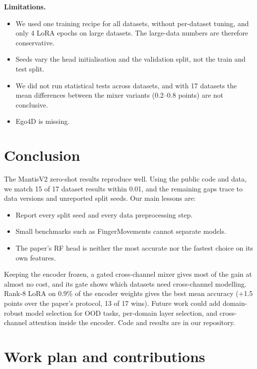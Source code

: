 \documentclass[conference]{IEEEtran}
\begin{document}
\textbf{Limitations.}
\begin{itemize}
\item We used one training recipe for all datasets, without per-dataset tuning, and only 4 LoRA epochs on large
datasets. The large-data numbers are therefore conservative.
\item Seeds vary the head initialisation and the validation split, not the train and test split.
\item We did not run statistical tests across datasets, and with 17 datasets the mean differences between the mixer
variants (0.2--0.8 points) are not conclusive.
\item Ego4D is missing.
\end{itemize}

\section{Conclusion}

The MantisV2 zero-shot results reproduce well. Using the public code and data, we match 15 of 17 dataset results
within 0.01, and the remaining gaps trace to data versions and unreported split seeds. Our main lessons are:
\begin{itemize}
\item Report every split seed and every data preprocessing step.
\item Small benchmarks such as FingerMovements cannot separate models.
\item The paper's RF head is neither the most accurate nor the fastest choice on its own features.
\end{itemize}
Keeping the encoder frozen, a gated cross-channel mixer gives most of the gain at almost no cost, and its gate shows
which datasets need cross-channel modelling. Rank-8 LoRA on 0.9\% of the encoder weights gives the best mean
accuracy (+1.5 points over the paper's protocol, 13 of 17 wins). Future work could add domain-robust model selection
for OOD tasks, per-domain layer selection, and cross-channel attention inside the encoder. Code and results are in
our repository.

\clearpage
\section*{Work plan and contributions}
\end{document}
